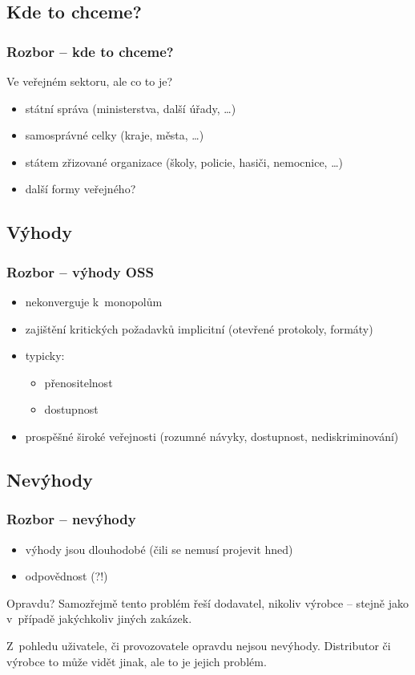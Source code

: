 \documentclass[12pt]{beamer}
\begin{document}
\subsection{Kde to chceme?}
\begin{frame}
 \frametitle{Rozbor -- kde to chceme?}
 Ve veřejném sektoru, ale co to je?
 \begin{itemize}
  \item státní správa (ministerstva, další úřady, \ldots{})
  \item samosprávné celky (kraje, města, \ldots{})
  \item státem zřizované organizace (školy, policie, hasiči, nemocnice, \ldots{})
  \item další formy veřejného? 
 \end{itemize}
\end{frame}

\subsection{Výhody}
\begin{frame}
 \frametitle{Rozbor -- výhody OSS}
 \begin{itemize}
  \item nekonverguje k~monopolům
  \item zajištění kritických požadavků implicitní (otevřené protokoly, formáty)
  \item typicky:
   \begin{itemize}
    \item přenositelnost
    \item dostupnost
   \end{itemize}
  \item prospěšné široké veřejnosti (rozumné návyky, dostupnost, nediskriminování)
 \end{itemize}
\end{frame}


\subsection{Nevýhody}
\begin{frame}
 \frametitle{Rozbor -- nevýhody}
 \begin{itemize}
  \item výhody jsou dlouhodobé (čili se nemusí projevit hned)
  \item odpovědnost (?!)
 \end{itemize}

Opravdu? Samozřejmě tento problém řeší dodavatel, nikoliv výrobce -- stejně jako v~případě jakýchkoliv jiných zakázek.

Z~pohledu uživatele, či provozovatele opravdu nejsou nevýhody. Distributor či výrobce to může vidět jinak, ale to je jejich problém.
\end{frame}
\end{document}

